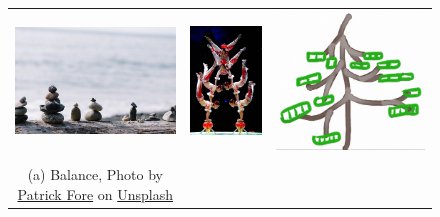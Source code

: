 \documentclass[addpoints]{exam}
\begin{document}
\begin{figure}[h]
\footnotesize  
  \begin{tabular}{ccc}
    \includegraphics[width=.4\textwidth, align=c]{balance}
    &
      \includegraphics[height=.3\textheight, align=c]{circus}
    &
    \includegraphics[width=.25\textwidth, align=c]{btree}
    \\
    \\
    (a) Balance, Photo by \href{https://unsplash.com/@patrickian4?utm_source=unsplash&utm_medium=referral&utm_content=creditCopyText}{Patrick Fore} on \href{https://unsplash.com/?utm_source=unsplash&utm_medium=referral&utm_content=creditCopyText}{Unsplash}

\end{tabular}
\end{figure}
\end{document}
